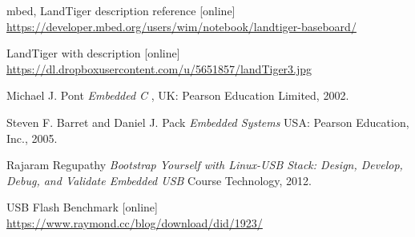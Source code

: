 \documentclass{BscUS}
\begin{document}
\begin{thebibliography}{1}
 mbed, LandTiger description reference [online]
\newline 
\url{https://developer.mbed.org/users/wim/notebook/landtiger-baseboard/}

 LandTiger with description [online] \\
\url{https://dl.dropboxusercontent.com/u/5651857/landTiger3.jpg}

 Michael J. Pont {\em Embedded C       },  UK: Pearson Education Limited, 2002.

 Steven F. Barret and Daniel J. Pack {\em Embedded Systems} USA: Pearson Education, Inc., 2005.

 Rajaram Regupathy {\em Bootstrap Yourself with Linux-USB Stack: Design, Develop, Debug, and Validate Embedded USB } Course Technology, 2012.


 USB Flash Benchmark [online] \\
\url{https://www.raymond.cc/blog/download/did/1923/}
\end{thebibliography}
\end{document}
